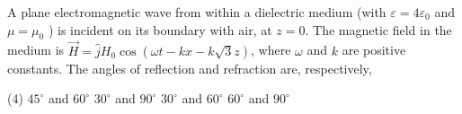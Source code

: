 \begin{enumerate}
\begin{minipage}{\textwidth}
	\item A plane electromagnetic wave from within a dielectric medium (with $\varepsilon=4 \varepsilon_{0}$ and $\mu=\mu_{0}$ ) is incident on its boundary with air, at $z=0$. The magnetic field in the medium is $\vec{H}=\hat{j} H_{0} \cos (\omega t-k x-k \sqrt{3} z)$, where $\omega$ and $k$ are positive constants.
	The angles of reflection and refraction are, respectively,
\end{minipage}
\begin{tasks}(4)
	\task[\textbf{A.}] $45^{\circ}$ and $60^{\circ}$
	\task[\textbf{B.}]$30^{\circ}$ and $90^{\circ}$
	\task[\textbf{C.}]$30^{\circ}$ and $60^{\circ}$
	\task[\textbf{D.}]$60^{\circ}$ and $90^{\circ}$
\end{tasks}


\end{enumerate}
